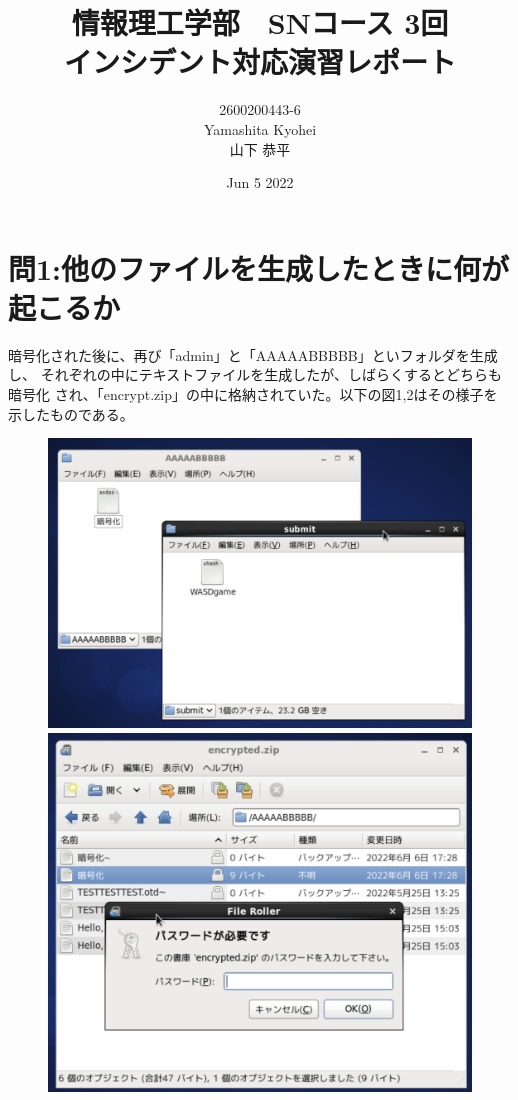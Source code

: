 \documentclass[dvipdfmx,autodetect-engine,titlepage]{jsarticle}
\title{情報理工学部　SNコース 3回\\
インシデント対応演習レポート\\}
\author{2600200443-6\\Yamashita Kyohei\\山下 恭平}
\date{Jun 5 2022}
\begin{document}
\maketitle

\section{問1:他のファイルを生成したときに何が起こるか}

暗号化された後に、再び「admin」と「AAAAABBBBB」といフォルダを生成し、
それぞれの中にテキストファイルを生成したが、しばらくするとどちらも暗号化
され、「encrypt.zip」の中に格納されていた。以下の図1,2はその様子を
示したものである。

\begin{figure}[h]
  \centering
  \begin{minipage}[b]{0.45\linewidth}
  \begin{center}
    \includegraphics[keepaspectratio,scale=0.35]{pic1.png}
    \end{center}
    \caption{}
  \end{minipage}
  \begin{minipage}[b]{0.45\linewidth}
  \begin{center}
    \includegraphics[keepaspectratio,scale=0.35]{pic2.png}

\end{center}
\end{minipage}
\end{figure}
\end{document}
